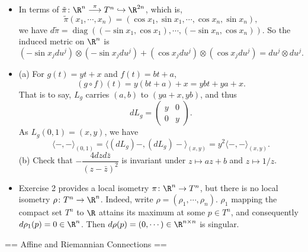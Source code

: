 \begin{itemize}
    \item[2.] In terms of $\tilde{\pi}\colon
    \R^n\stackrel{\pi}{\longrightarrow}{T^n}\hookrightarrow\R^{2n}$, 
    which is, \[\tilde{\pi}(x_1,\cdots,x_n)
    =(\cos x_1,\sin x_1,\cdots,\cos x_n,\sin x_n),\] 
    we have $d\tilde{\pi}=\operatorname{diag}((-\sin x_1,\cos x_1),\cdots,(-\sin x_n,\cos x_n))$. 
    So the induced metric on $\R^n$ is 
    \[(-\sin x_j du^j)\otimes(-\sin x_j du^j)
    +(\cos x_j du^j)\otimes(\cos x_j du^j)=du^j\otimes du^j.\]

    \item[4.] (a) For $g(t)=yt+x$ and $f(t)=bt+a$, 
    \[(g\circ f)(t)=y(bt+a)+x=ybt+ya+x.\]
    That is to say, $L_g$ carries $(a,b)$ to $(ya+x,yb)$, and thus
    \[dL_g=\begin{pmatrix}y&0\\0&y\end{pmatrix}.\]
    As $L_g(0,1)=(x,y)$, we have
    \[\langle-,-\rangle_{(0,1)}=\langle(dL_g)-,(dL_g)-\rangle_{(x,y)}
    =y^2\langle-,-\rangle_{(x,y)}.\]
    (b) Check that $-\dfrac{4dzd\bar{z}}{(z-\bar{z})^2}$ 
    is invariant under $z\mapsto az+b$ and $z\mapsto 1/z$.

    \item[6.] Exercise 2 provides a local isometry $\pi\colon\R^n\to T^n$, 
    but there is no local isometry $\rho\colon T^n\to\R^n$. 
    Indeed, write $\rho=(\rho_1,\cdots,\rho_n)$. 
    $\rho_1$ mapping the compact set $T^n$ to $\R$ 
    attains its maximum at some $p\in T^n$, 
    and consequently $d\rho_1(p)=0\in\R^n$. 
    Then $d\rho(p)=(0,\cdots)\in\R^{n\times n}$ is singular.
\end{itemize}

== Affine and Riemannian Connections ==


